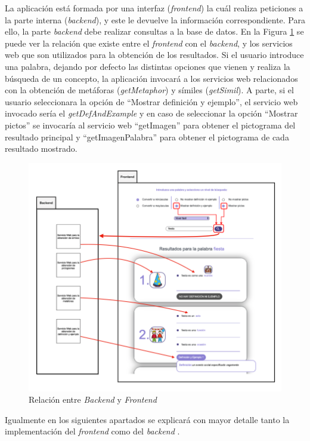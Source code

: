 La aplicación está formada por una interfaz (\textit{frontend}) la cuál realiza peticiones a la parte interna (\textit{backend}), y este le devuelve la información correspondiente. Para ello, la parte \textit{backend} debe realizar consultas a la base de datos. En la Figura \ref{fig:relacionBackFront}  se puede ver la relación que existe entre el \textit{frontend} con el \textit{backend}, y los servicios web que son utilizados para la obtención de los resultados.
Si el usuario introduce una palabra, dejando por defecto las distintas opciones que vienen y realiza la búsqueda de un concepto, la aplicación invocará a los servicios web relacionados con la obtención de metáforas (\textit{getMetaphor}) y símiles (\textit{getSimil}). A parte, si el usuario seleccionara la opción de ``Mostrar definición y ejemplo'', el servicio web invocado sería el \textit{getDefAndExample} y en caso de seleccionar la opción  ``Mostrar pictos'' se invocaría al servicio web ``getImagen'' para obtener el pictograma del resultado principal y ``getImagenPalabra'' para obtener el pictograma de cada resultado mostrado.

\begin{figure}[!h]
	\includegraphics[width=1.2\textwidth]{Imagenes/Bitmap/Capitulo4/RelacionBackFront.png}
	\centering
	\caption{Relación entre \textit{Backend} y \textit{Frontend}}
	\label{fig:relacionBackFront}
\end{figure}


 Igualmente en los siguientes apartados se explicará con mayor detalle tanto la implementación del \textit{frontend} como del \textit{backend} . 

